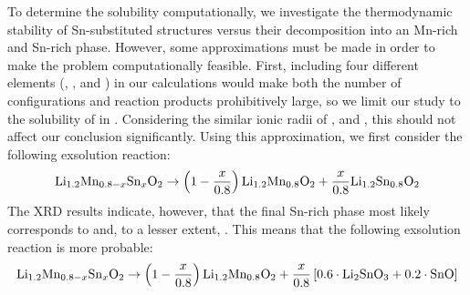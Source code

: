 \begin{refsection}
To determine the  solubility computationally, we investigate the 
thermodynamic stability of Sn-substituted structures versus their 
decomposition into an Mn-rich and Sn-rich phase. However, some approximations 
must be made in order to make the problem computationally feasible. First, 
including four different elements (, ,  and ) in 
our calculations would make both the number of configurations and reaction 
products prohibitively large, so we limit our study to the solubility of 
 in . Considering the similar ionic radii of 
,  and , this should not affect our 
conclusion significantly. Using this approximation, we first consider the 
following exsolution reaction: 
\begin{equation} 
 \ce{Li_{1.2}Mn_{0.8-x}Sn_xO2} \rightarrow  \left( 1 - \frac{x}{0.8} \right) 
\ce{Li_{1.2}Mn_{0.8}O2} +  \frac{x}{0.8} \ce{Li_{1.2}Sn_{0.8}O2}  
\end{equation} 
The XRD results indicate, however, that the final Sn-rich phase most likely 
corresponds to  and, to a lesser extent, . This means that 
the following exsolution reaction is more probable: 
\begin{equation} \label{batteries:eq-exsolution} 
 \ce{Li_{1.2}Mn_{0.8-x}Sn_xO2} \rightarrow  \left( 1 - \frac{x}{0.8} \right) 
\ce{Li_{1.2}Mn_{0.8}O2} +  \frac{x}{0.8} \left[  0.6 \cdot \ce{Li2SnO3} + 0.2 
\cdot \ce{SnO} \right] 
\end{equation} 
 

\end{refsection}
